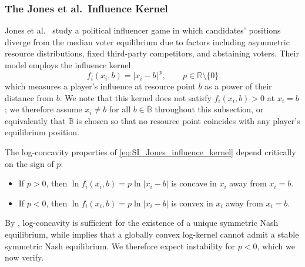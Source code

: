 \documentclass{article}
\begin{document}
        \subsubsection{The Jones et al.\ Influence Kernel}\label{subsubsec:SI_jones_model}
            Jones et al.\ \cite{jones2022polarization} study a political influencer game in which candidates' positions diverge from the median voter equilibrium due to factors including asymmetric resource distributions, fixed third-party competitors, and abstaining voters. Their model employs the influence kernel
            \begin{equation}\label{eq:SI_Jones_influence_kernel}
                f_i(x_i, b) = |x_i - b|^{\,p}, \qquad p \in \mathbb{R} \setminus \{0\}
            \end{equation}
            which measures a player's influence at resource point $b$ as a power of their distance from $b$. We note that this kernel does not satisfy $f_i(x_i,b) > 0$ at $x_i = b$; we therefore assume $x_i \neq b$ for all $b \in \mathbb{B}$ throughout this subsection, or equivalently that $\mathbb{B}$ is chosen so that no resource point coincides with any player's equilibrium position.

            The log-concavity properties of \cref{eq:SI_Jones_influence_kernel} depend critically on the sign of $p$:
            \begin{itemize}
                \item If $p > 0$, then $\ln f_i(x_i,b) = p\ln|x_i - b|$ is concave in $x_i$ away from $x_i = b$.
                \item If $p < 0$, then $\ln f_i(x_i,b) = p\ln|x_i - b|$ is convex in $x_i$ away from $x_i = b$.
            \end{itemize}
            By , log-concavity is sufficient for the existence of a unique symmetric Nash equilibrium, while  implies that a globally convex log-kernel cannot admit a stable symmetric Nash equilibrium. We therefore expect instability for $p < 0$, which we now verify.
\end{document}
